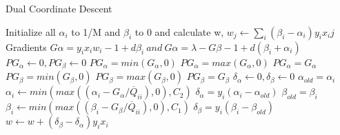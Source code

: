 \begin{algorithm}
\caption{Dual Coordinate Descent}\label{array-sum}
\begin{algorithmic}[1]
	\State Initialize all $\alpha_i$ to 1/M and $\beta_i$ to 0 and calculate w, $w_j \gets \sum_i{(\beta_i-\alpha_i)y_ix_ij}$
		    \State Gradients $G\alpha = y_ix_iw_i - 1 + d\beta_i \:and\:G\alpha = \lambda - G\beta - 1 + d(\beta_i+\alpha_i)$
		    \State $PG_\alpha \gets 0, PG_\beta \gets 0$
		    \State $PG_\alpha = min(G_\alpha,0)$
		    \State $PG_\alpha = max(G_\alpha,0)$
		    \Else
		    \State $PG_\alpha = G_\alpha$
		    \EndIf
		    \State $PG_\beta = min(G_\beta,0)$
		    \State $PG_\beta = max(G_\beta,0)$
		    \Else
		    \State $PG_\beta = G_\beta$
		    \EndIf
            \State $\delta_\alpha \gets 0 , \delta_\beta \gets 0$
                \State $\alpha_{old} = \alpha_i$
                \State $\alpha_i \gets min(max((\alpha_i - G_\alpha/\overline{Q}_{ii}),0),C_2)$
                \State $\delta_\alpha = y_i(\alpha_i - \alpha_{old})$
            \EndIf
                \State $\beta_{old} = \beta_i$
                \State $\beta_i \gets min(max((\beta_i - G_\beta/\overline{Q}_{ii}),0),C_1)$
                \State $\delta_\beta = y_i(\beta_i - \beta_{old})$
            \EndIf
                \State $w \gets  w + (\delta_\beta-\delta_\alpha)y_ix_i$
            \EndIf      
    	\EndFor
	\EndWhile
	\EndProcedure
\end{algorithmic}
\end{algorithm}


